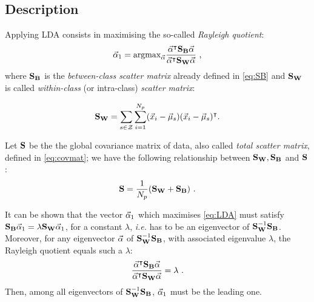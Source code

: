 \subsection{Description} Applying LDA consists in maximising the so-called {\em Rayleigh quotient}:
 \begin{equation}\label{eq:LDA}
 \vec{\alpha}_1=\mathrm{argmax}_{\vec{\alpha}} \frac{\vec{\alpha}^\intercal \textbf{S}_{\textbf{B}} \vec{\alpha}}{\vec{\alpha}^\intercal \textbf{S}_{\textbf{W}} \vec{\alpha}} \mbox{ ,}
 \end{equation}
where $\textbf{S}_{\textbf{B}}$ is the {\em between-class scatter matrix} already defined in \eqref{eq:SB} and $\textbf{S}_{\textbf{W}}$ is called 
{\em within-class} (or intra-class) {\em scatter matrix}:

\begin{equation}
\textbf{S}_{\textbf{W}} = \sum_{s\in\mathcal{Z}}\sum_{i=1}^{N_p}(\vec{x}_i-\vec{\mu}_{s})(\vec{x}_i-\vec{\mu}_{s})^\intercal \mbox{.}
\end{equation}


\begin{remark}
Let $\textbf{S}$ be the the global covariance matrix of data, also called {\em total scatter matrix}, defined in \eqref{eq:covmat}; we have the following relationship between $\textbf{S}_{\textbf{W}},\textbf{S}_{\textbf{B}}$ and $\textbf{S}$:
\begin{equation}
\textbf{S} = \frac{1}{N_p}(\textbf{S}_{\textbf{W}} + \textbf{S}_{\textbf{B}}) \mbox{ .}
\end{equation}
\end{remark}

It can be shown that the vector $\vec{\alpha}_1$ which maximises \eqref{eq:LDA} must satisfy $\textbf{S}_{\textbf{B}}\vec{\alpha}_1 = \lambda \textbf{S}_{\textbf{W}} \vec{\alpha}_1$, for a constant $\lambda$, \textit{i.e.} has to be an eigenvector of $\textbf{S}_{\textbf{W}}^{-1} \textbf{S}_{\textbf{B}}$. Moreover, for any eigenvector $\vec{\alpha}$ of $\textbf{S}_{\textbf{W}}^{-1}\textbf{S}_{\textbf{B}}$, with associated eigenvalue $\lambda$, the Rayleigh quotient equals such a $\lambda$:
\begin{equation}\label{eq:lambdas}
\frac{\vec{\alpha}^\intercal \textbf{S}_{\textbf{B}} \vec{\alpha}}{\vec{\alpha}^\intercal \textbf{S}_{\textbf{W}} \vec{\alpha}} = \lambda \mbox{ .}
\end{equation}
Then, among all eigenvectors of $\textbf{S}_{\textbf{W}}^{-1} \textbf{S}_{\textbf{B}}$, $\vec{\alpha}_1$ must be the leading one. \\

